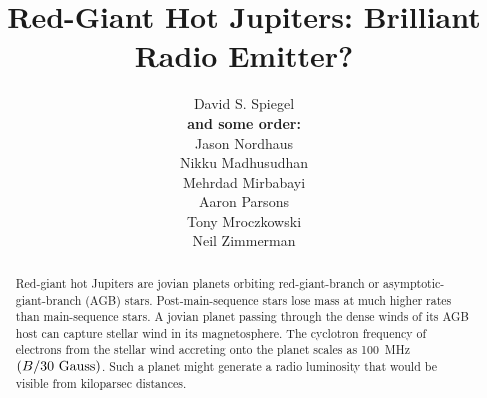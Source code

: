 \documentclass{emulateapj}
\begin{document}

\title{Red-Giant Hot Jupiters: Brilliant Radio Emitter?}


\author{
%
David S. Spiegel \\
%
{\bf and some order:} \\
%
Jason Nordhaus \\
%
Nikku Madhusudhan \\
%
Mehrdad Mirbabayi \\
%
Aaron Parsons \\
%
Tony Mroczkowski \\
%
Neil Zimmerman
}









\vspace{0.5\baselineskip}



\begin{abstract}
  Red-giant hot Jupiters are jovian planets orbiting red-giant-branch
  or asymptotic-giant-branch (AGB) stars.  Post-main-sequence stars
  lose mass at much higher rates than main-sequence stars.  A jovian
  planet passing through the dense winds of its AGB host can capture
  stellar wind in its magnetosphere.  The cyclotron frequency of
  electrons from the stellar wind accreting onto the planet scales as
  100~MHz~$(B/30 {\rm~Gauss})$.  Such a planet might generate a radio
  luminosity that would be visible from kiloparsec distances.
\end{abstract}


\end{document}
